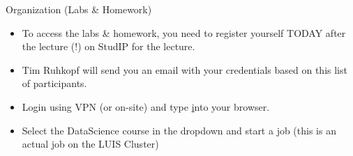 \documentclass[aspectratio=169]{../latex_main/tntbeamer}  %
\begin{document}
\begin{frame}[c]{Organization (Labs \& Homework)}

\vspace{-1em}
\begin{itemize}
    \item To access the labs \& homework, you need to  \alert{register yourself TODAY after the lecture (!) on StudIP for the lecture}. 
    \item Tim Ruhkopf will send you an email with your credentials based on this list of participants. 
    \item Login using VPN (or on-site) and type  \href{https://jupyterhub.cluster.uni-hannover.de/} into your browser.
    \item Select the DataScience course in the dropdown and start a job 
    (this is an actual job on the LUIS Cluster)
\end{itemize}

\end{frame}

\end{document}

